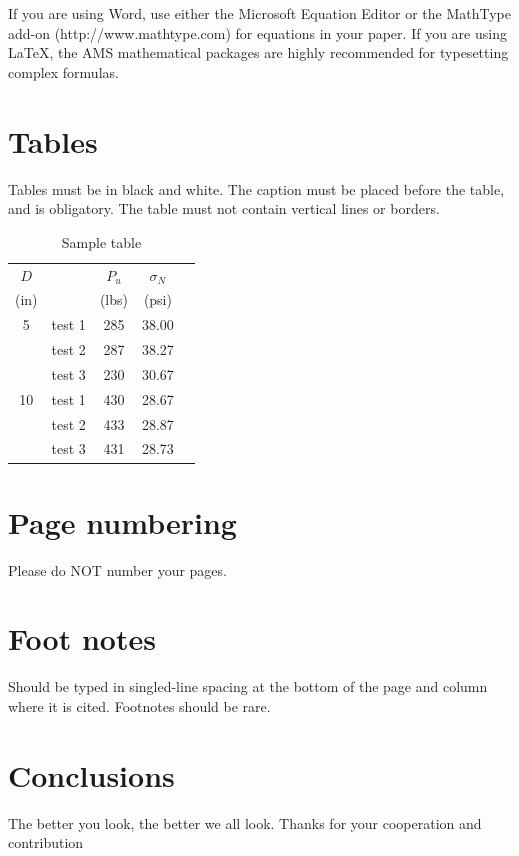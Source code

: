 \documentclass{jcst}
\begin{document}
 If you are using Word, use either the Microsoft Equation Editor or the MathType add-on
(http://www.mathtype.com) for equations in your paper. If you are using LaTeX, the
AMS mathematical packages are highly recommended for typesetting complex formulas.

\section{Tables}

Tables must be in black and white. The caption must be placed before the table,
and is obligatory. The table must not contain vertical lines or borders.

\begin{table}[tp]
\caption{Sample table}
\label{sampletable}
\centering
\begin{tabular}{clccc}
\toprule
$D$ &               & $P_u$      & $\sigma_N$    \\
(in)&               & (lbs)      & (psi)          \\ \otoprule
%
5    & test 1      & 285         & 38.00          \\
& test 2      & 287         & 38.27          \\
& test 3      & 230         & 30.67          \\ \midrule
10   & test 1      & 430         & 28.67          \\
& test 2      & 433         & 28.87          \\
& test 3      & 431         & 28.73          \\ \bottomrule
\end{tabular}
\end{table}

\section{Page numbering}
Please do NOT number your pages.

\section{Foot notes}
Should be typed in singled-line spacing at the bottom of the page and column where it is cited. Footnotes should be rare.

\section{Conclusions}
The better you look, the better we all look. Thanks for your cooperation and contribution
\end{document}
